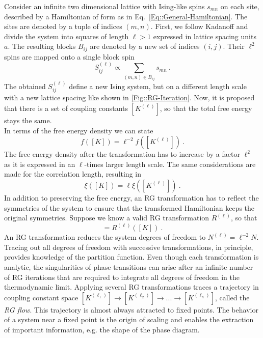 	Consider an infinite two dimensional lattice with Ising-like spins $s_{mn}$ on each site, described by a Hamiltonian of form as in Eq.~\eqref{Eq::General-Hamiltonian}. The sites are denoted by a tuple of indices $(m,n)$. First, we follow Kadanoff \cite{kadanoff1966scaling} and divide the system into squares of length $\ell >	1$ expressed in lattice spacing units $a$. The resulting blocks $B_{ij}$ are denoted by a new set of indices $(i,j)$. Their $\ell^2$ spins are mapped onto a single block spin
	\begin{equation}
		S^{(\ell)}_{ij} \propto	\sum_{(m,n) \in  B_{ij}} s_{mn} ~.
	\end{equation}
	The obtained $S_{ij}^{(\ell)}$ define a new Ising system, but on a different length scale with a new lattice spacing like shown in \autoref{Fig::RG-Iteration}. Now, it is proposed that there is a set of coupling constants $[K^{(\ell)}]$, so that the total free energy stays the same. \\
	In terms of the free energy density we can state
	\begin{equation} \label{free-energy-density}
		f\left([K]\right) =	\ell^{-2} f\left([K^{(\ell)}]\right)~.
	\end{equation}
	The free energy density after the transformation has to increase by a factor $\ell^2$ as it is expressed in an $\ell$-times larger length scale. The same considerations are made for the correlation length, resulting in
	\begin{equation}
		\xi\left([K]\right) = \ell \xi\left([K^{(\ell)}]\right)~.
	\end{equation}
	In addition to preserving the free energy, an RG transformation has to reflect the symmetries of the system to ensure that the transformed Hamiltonian keeps the original symmetries. Suppose we know a valid RG transformation $R^{(\ell)}$, so that
	\begin{equation}
		[K^{(\ell)}] =	R^{(\ell)}([K])~.
	\end{equation}
	An RG transformation reduces the system degrees of freedom to $N^{(\ell)} =	\ell^{-2} N$. Tracing out all degrees of freedom with successive transformations, in principle, provides knowledge of the partition function.  Even though each transformation is analytic, the singularities of phase transitions can arise after an infinite number of RG iterations that are required to integrate all degrees of freedom in the thermodynamic limit. Applying several RG transformations traces a trajectory in coupling constant space $[K^{(\ell_1)}] \rightarrow [K^{(\ell_2)}]  \rightarrow ... \rightarrow [K^{(\ell_n)}]$, called the \textit{RG flow}. This trajectory is almost always attracted to fixed points. The behavior of a system near a fixed point is the origin of scaling and enables the extraction of important information, e.g. the shape of the phase diagram.
	
